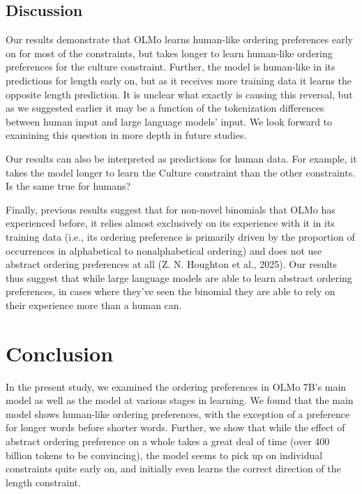 \documentclass[
  10pt,
  nohyperref]{acl}
\begin{document}
\subsection{Discussion}\label{discussion-1}

Our results demonstrate that OLMo learns human-like ordering preferences
early on for most of the constraints, but takes longer to learn
human-like ordering preferences for the culture constraint. Further, the
model is human-like in its predictions for length early on, but as it
receives more training data it learns the opposite length prediction. It
is unclear what exactly is causing this reversal, but as we suggested
earlier it may be a function of the tokenization differences between
human input and large language models' input. We look forward to
examining this question in more depth in future studies.

Our results can also be interpreted as predictions for human data. For
example, it takes the model longer to learn the Culture constraint than
the other constraints. Is the same true for humans?

Finally, previous results suggest that for non-novel binomials that OLMo
has experienced before, it relies almost exclusively on its experience
with it in its training data (i.e., its ordering preference is primarily
driven by the proportion of occurrences in alphabetical to
nonalphabetical ordering) and does not use abstract ordering preferences
at all (Z. N. Houghton et al., 2025). Our results thus suggest that
while large language models are able to learn abstract ordering
preferences, in cases where they've seen the binomial they are able to
rely on their experience more than a human can.

\section{Conclusion}\label{conclusion}

In the present study, we examined the ordering preferences in OLMo 7B's
main model as well as the model at various stages in learning. We found
that the main model shows human-like ordering preferences, with the
exception of a preference for longer words before shorter words.
Further, we show that while the effect of abstract ordering preference
on a whole takes a great deal of time (over 400 billion tokens to be
convincing), the model seems to pick up on individual constraints quite
early on, and initially even learns the correct direction of the length
constraint.
\end{document}
